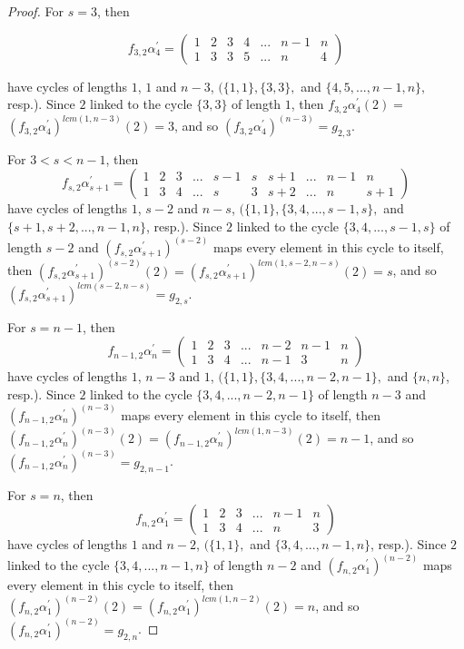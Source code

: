 \documentclass[10pt]{extarticle}
\numberwithin{equation}{section}
\numberwithin{bbb}{section}
\numberwithin{equation}{section}
\begin{document}
\begin{proof}
\vspace{0.3cm}
For $s=3$, then

$$f_{3,2} \alpha^{\prime}_{4}=
\begin{pmatrix}  
1&2&3&4&...&n-1&n\\1&3&3&5&...&n&4
\end{pmatrix}$$


have cycles of lengths $1$, $1$ and $n-3$, $( \{1,1\}, \{3,3\},$ and $\{4,5,...,n-1,n\},$ resp.). Since $2$ linked to the cycle $\{3,3\}$ of length $1$, then 
$f_{3,2} \alpha^{\prime}_{4}(2)=$$(f_{3,2} \alpha^{\prime}_{4})^{lcm(1,n-3)}(2)=3$, and so $(f_{3,2} \alpha^{\prime}_{4})^{(n-3)}=g_{2,3}$.

\vspace{0.5cm}
For $3<s<n-1$,
then $$f_{s,2} \alpha^{\prime}_{s+1}=
\begin{pmatrix}  
1&2&3&...&s-1&s&s+1&...&n-1&n\\1&3&4&...&s&3&s+2&...&n&s+1
\end{pmatrix}$$
have cycles of lengths $1$, $s-2$ and $n-s$, $( \{1,1\}, \{3,4,...,s-1,s\},$ and $\{s+1,s+2,...,n-1,n\}$, resp.). Since $2$ linked to the cycle $\{3,4,...,s-1,s\}$ of length $s-2$ and $(f_{s,2} \alpha^{\prime}_{s+1})^{(s-2)}$ maps every element in this cycle to itself, then $(f_{s,2} \alpha^{\prime}_{s+1})^{(s-2)}(2)=$$(f_{s,2} \alpha^{\prime}_{s+1})^{lcm(1,s-2,n-s)}(2)=s$, and so $(f_{s,2} \alpha^{\prime}_{s+1})^{lcm(s-2,n-s)}=g_{2,s}$.

\vspace{0.5cm}
For $s=n-1$,
then $$f_{n-1,2} \alpha^{\prime}_{n}=
\begin{pmatrix}  
1&2&3&...&n-2&n-1&n\\1&3&4&...&n-1&3&n
\end{pmatrix}$$
have cycles of lengths $1$, $n-3$ and $1$, $( \{1,1\}, \{3,4,...,n-2,n-1\},$ and $\{n,n\}$, resp.). Since $2$ linked to the cycle $\{3,4,...,n-2,n-1\}$ of length $n-3$ and $(f_{n-1,2} \alpha^{\prime}_{n})^{(n-3)}$ maps every element in this cycle to itself, then $(f_{n-1,2} \alpha^{\prime}_{n})^{(n-3)}(2)=(f_{n-1,2} \alpha^{\prime}_{n})^{lcm(1,n-3)}(2)=n-1$, and so $(f_{n-1,2} \alpha^{\prime}_{n})^{(n-3)}=g_{2,n-1}$.

\vspace{0.5cm}
For $s=n$,
then $$f_{n,2} \alpha^{\prime}_{1}=
\begin{pmatrix}  
1&2&3&...&n-1&n\\1&3&4&...&n&3
\end{pmatrix}$$ 
have cycles of lengths $1$ and $n-2$, $( \{1,1\},$ and $\{3,4,...,n-1,n\}$, resp.). Since $2$ linked to the cycle $\{3,4,...,n-1,n\}$ of length $n-2$ and $(f_{n,2} \alpha^{\prime}_{1})^{(n-2)}$ maps every element in this cycle to itself, then $(f_{n,2} \alpha^{\prime}_{1})^{(n-2)}(2)=(f_{n,2} \alpha^{\prime}_{1})^{lcm(1,n-2)}(2)=n$, and so $(f_{n,2} \alpha^{\prime}_{1})^{(n-2)}=g_{2,n}$.


\end{proof}
\end{document}
